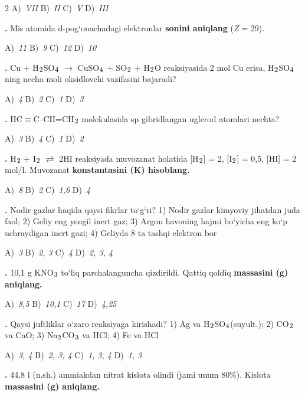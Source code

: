 \documentclass[11pt,a4paper]{article}
\renewcommand{\textsubscript}[1]{\ensuremath{_{\text{\fontsize{8}{8}\selectfont #1}}}}
\newcommand{\qn}[1]{\textbf{\fontsize{11.5}{13}\selectfont #1}}
\newcommand{\qsep}{\par\vspace{1pt}\noindent\rule{0pt}{0.4pt}\par\vspace{5pt}}
\begin{document}
\begin{multicols}{2}
\noindent A)~\textsl{VII} \hfill B)~\textsl{II} \hfill C)~\textsl{\textit{V}} \hfill D)~\textsl{III}\par
\qsep
\noindent\qn{10.} Mis atomida d-pog`onachadagi elektronlar \textbf{sonini aniqlang} (\textit{Z} = 29).

\noindent A)~\textsl{11} \hfill B)~\textsl{9} \hfill C)~\textsl{12} \hfill D)~\textsl{10}\par
\qsep
\noindent\qn{11.} Cu + H\textsubscript{2}SO\textsubscript{4} $\to$ CuSO\textsubscript{4} + SO\textsubscript{2} + H\textsubscript{2}O reaksiyasida 2 mol Cu erisa, H\textsubscript{2}SO\textsubscript{4} ning necha moli oksidlovchi vazifasini bajaradi?

\noindent A)~\textsl{4} \hfill B)~\textsl{2} \hfill C)~\textsl{1} \hfill D)~\textsl{3}\par
\qsep
\noindent\qn{12.} HC$\equiv$C--CH=CH\textsubscript{2} molekulasida sp gibridlangan uglerod atomlari nechta?

\noindent A)~\textsl{3} \hfill B)~\textsl{4} \hfill C)~\textsl{1} \hfill D)~\textsl{2}\par
\qsep
\noindent\qn{13.} H\textsubscript{2} + I\textsubscript{2} $\rightleftarrows$ 2HI reaksiyada muvozanat holatida [H\textsubscript{2}] = 2, [I\textsubscript{2}] = 0,5, [HI] = 2 mol/l. Muvozanat \textbf{konstantasini (K) hisoblang.}

\noindent A)~\textsl{8} \hfill B)~\textsl{2} \hfill C)~\textsl{1,6} \hfill D)~\textsl{4}\par
\qsep
\noindent\qn{14.} Nodir gazlar haqida qaysi fikrlar to`g`ri? 1) Nodir gazlar kimyoviy jihatdan juda faol; 2) Geliy eng yengil inert gaz; 3) Argon havoning hajmi bo`yicha eng ko`p uchraydigan inert gazi; 4) Geliyda 8 ta tashqi elektron bor

\noindent A)~\textsl{3} \hfill B)~\textsl{2, 3} \hfill C)~\textsl{4} \hfill D)~\textsl{2, 3, 4}\par
\qsep
\noindent\qn{15.} 10,1 g KNO\textsubscript{3} to`liq parchalanguncha qizdirildi. Qattiq qoldiq \textbf{massasini (g) aniqlang.}

\noindent A)~\textsl{8,5} \hfill B)~\textsl{10,1} \hfill C)~\textsl{17} \hfill D)~\textsl{4,25}\par
\qsep
\noindent\qn{16.} Qaysi juftliklar o`zaro reaksiyaga kirishadi? 1) Ag va H\textsubscript{2}SO\textsubscript{4}(suyult.); 2) CO\textsubscript{2} va CaO; 3) Na\textsubscript{2}CO\textsubscript{3} va HCl; 4) Fe va HCl

\noindent A)~\textsl{3, 4} \hfill B)~\textsl{2, 3, 4} \hfill C)~\textsl{1, 3, 4} \hfill D)~\textsl{1, 3}\par
\qsep
\noindent\qn{17.} 44,8 l (n.sh.) ammiakdan nitrat kislota olindi (jami unum 80\%). Kislota \textbf{massasini (g) aniqlang.}


\end{multicols}
\end{document}
